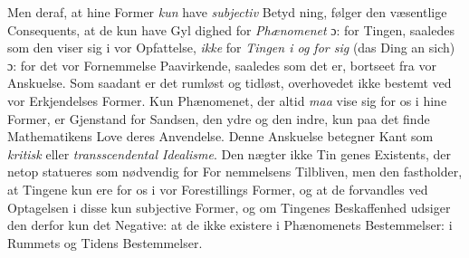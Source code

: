 \documentclass[12pt,a4paper]{book}
\begin{document}
Men deraf, at hine Former \emph{kun} have \emph{subjectiv} Betyd\-%
ning, følger den væsentlige Consequents, at de kun have Gyl\-%
dighed for \emph{Phænomenet} ɔ: for Tingen, saaledes som den
viser sig i vor Opfattelse, \emph{ikke} for \emph{Tingen i og for sig}
(das Ding an sich) ɔ: for det vor Fornemmelse Paavirkende,
saaledes som det er, bortseet fra vor Anskuelse. Som saadant
er det rumløst og tidløst, overhovedet ikke bestemt ved vor
Erkjendelses Former. Kun Phænomenet, der altid \emph{maa} vise
sig for os i hine Former, er Gjenstand for Sandsen, den ydre
og den indre, kun paa det finde Mathematikens Love deres
Anvendelse. Denne Anskuelse betegner Kant som \emph{kritisk}
eller \emph{transscendental Idealisme}. Den nægter ikke Tin\-%
genes Existents, der netop statueres som nødvendig for For\-%
nemmelsens Tilbliven, men den fastholder, at Tingene kun
ere for os i vor Forestillings Former, og at de forvandles ved
Optagelsen i disse kun subjective Former, og om Tingenes
Beskaffenhed udsiger den derfor kun det Negative: at de ikke
existere i Phænomenets Bestemmelser: i Rummets og Tidens
Bestemmelser.
\end{document}
